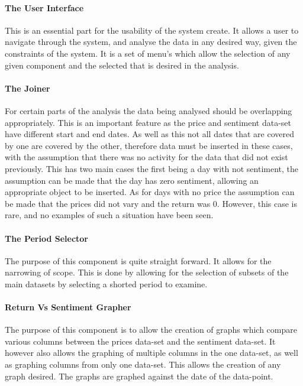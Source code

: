 \paragraph{The User Interface}

This is an essential part for the usability of the system create. It allows a user to navigate through the system, and analyse the data in any desired way, given the constraints of the system. It is a set of menu's which allow the selection of any given component and the selected that is desired in the analysis.

\paragraph{The Joiner}

For certain parts of the analysis the data being analysed should be overlapping appropriately. This is an important feature as the price and sentiment data-set have different start and end dates. As well as this not all dates that are covered by one are covered by the other, therefore data must be inserted in these cases, with the assumption that there was no activity for the data that did not exist previously. This has two main cases the first being a day with not sentiment, the assumption can be made that the day has zero sentiment, allowing an appropriate object to be inserted. As for days with no price the assumption can be made that the prices did not vary and the return was 0. However, this case is rare, and no examples of such a situation have been seen.

\paragraph{The Period Selector}

The purpose of this component is quite straight forward. It allows for the narrowing of scope. This is done by allowing for the selection of subsets of the main datasets by selecting a shorted period to examine.

\paragraph{Return Vs Sentiment Grapher}

The purpose of this component is to allow the creation of graphs which compare various columns between the prices data-set and the sentiment data-set. It however also allows the graphing of multiple columns in the one data-set, as well as graphing columns from only one data-set. This allows the creation of any graph desired. The graphs are graphed against the date of the data-point.

